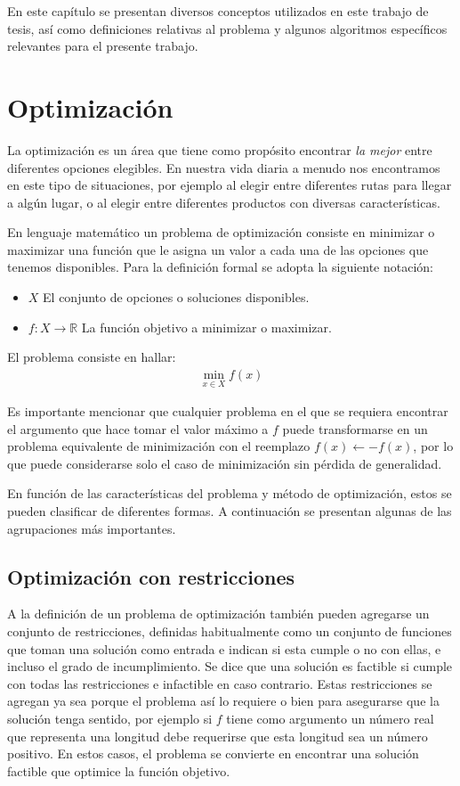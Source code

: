 En este capítulo se presentan diversos conceptos utilizados en este trabajo de tesis, así como definiciones relativas al problema 
y algunos algoritmos específicos relevantes para el presente trabajo.

\section{Optimización}
La optimización es un área que tiene como propósito encontrar \textit{la mejor} entre diferentes opciones elegibles. 
%
En nuestra vida diaria a menudo nos encontramos en este tipo de situaciones, por ejemplo al elegir entre diferentes rutas para 
llegar a algún lugar, o al elegir entre diferentes productos con diversas características.

En lenguaje matemático un problema de optimización consiste en minimizar o maximizar una función que le asigna un valor a cada una 
de las opciones que tenemos disponibles. 
%
Para la definición formal se adopta la siguiente notación:
\begin{itemize}
    \item $X$ El conjunto de opciones o soluciones disponibles.
    \item $f:X\rightarrow \mathbb{R}$ La función objetivo a minimizar o maximizar.
\end{itemize}

El problema consiste en hallar:
\begin{gather}
\min_{x\in X} f(x)
\end{gather}

Es importante mencionar que cualquier problema en el que se requiera encontrar el argumento que hace tomar el valor máximo a $f$ 
puede transformarse en un problema equivalente de minimización con el reemplazo $f(x) \leftarrow -f(x)$, por lo que puede considerarse 
solo el caso de minimización sin pérdida de generalidad.

En función de las características del problema y método de optimización, estos se pueden clasificar de diferentes formas. 
%
A continuación se presentan algunas de las agrupaciones más importantes.

\subsection*{Optimización con restricciones}
A la definición de un problema de optimización también pueden agregarse un conjunto de restricciones, definidas habitualmente como
un conjunto de funciones que toman una solución como entrada e indican si esta cumple o no con ellas, e incluso el grado
de incumplimiento.
%
Se dice que una solución es factible si cumple con todas las restricciones e infactible en caso contrario.
%
Estas restricciones se agregan ya sea porque el problema así lo requiere o bien para asegurarse que la solución tenga sentido, por ejemplo 
si $f$ tiene como argumento un número real que representa una longitud debe requerirse que esta longitud sea un número positivo.
%
En estos casos, el problema se convierte en encontrar una solución factible que optimice la función objetivo.

